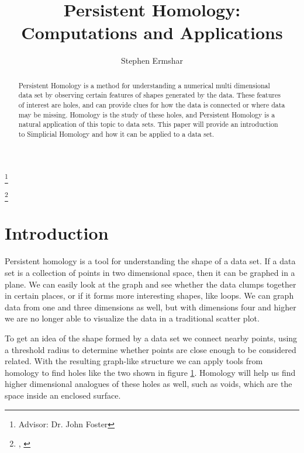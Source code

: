 

\title[Persistent Homology]{Persistent Homology: Computations and Applications}
\author{Stephen Ermshar}
\address{Department of Mathematics, Walla Walla University, College Place, WA 99324}
\date{} %
\thanks{Advisor: Dr. John Foster}

\thanks{\tiny{\DTMtoday, \DTMcurrenttime}}
\rfoot{\hfill\newline\tiny{\DTMtoday, \DTMcurrenttime}}




\begin{abstract}
    Persistent Homology is a method for understanding a numerical multi dimensional data set by observing certain features of shapes generated by the data.
    These features of interest are holes, and can provide clues for how the data is connected or where data may be missing.
    Homology is the study of these holes, and Persistent Homology is a natural application of this topic to data sets.
    This paper will provide an introduction to Simplicial Homology and how it can be applied to a data set.
\end{abstract}
\maketitle

\section{Introduction}

Persistent homology is a tool for understanding the shape of a data set.
If a data set is a collection of points in two dimensional space, then it can be graphed in a plane.
We can easily look at the graph and see whether the data clumps together in certain places, or if it forms more interesting shapes, like loops.
We can graph data from one and three dimensions as well, but with dimensions four and higher we are no longer able to visualize the data in a traditional scatter plot.

\begin{figure}[h]
    \centering
    \scalebox{0.75}{}
    \caption{}
    \label{fig:persistence-demo-r25}
\end{figure}

To get an idea of the shape formed by a data set we connect nearby points, using a threshold radius to determine whether points are close enough to be considered related.
With the resulting graph-like structure we can apply tools from homology to find holes like the two shown in figure \ref{fig:persistence-demo-r25}.
Homology will help us find higher dimensional analogues of these holes as well, such as voids, which are the space inside an enclosed surface.

